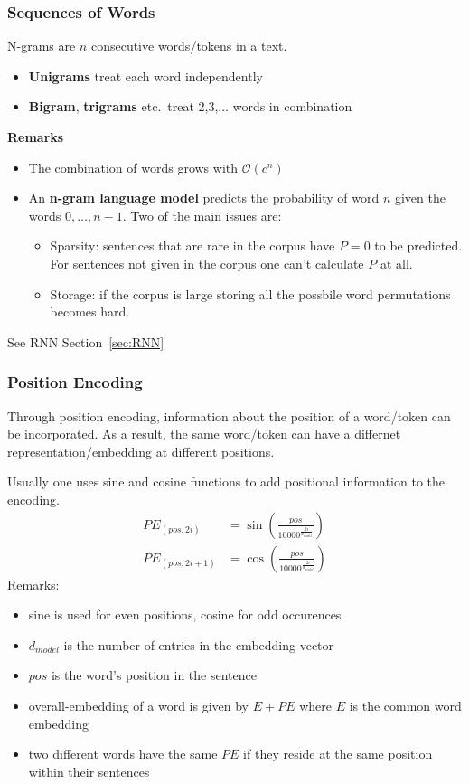 \subsubsection{Sequences of Words}
N-grams are $n$ consecutive words/tokens in a text.
\begin{itemize}
    \item \textbf{Unigrams} treat each word independently
    \item \textbf{Bigram}, \textbf{trigrams} etc.\ treat 2,3,$\ldots$ words in combination
\end{itemize}
\textbf{Remarks}
\begin{itemize}
    \item The combination of words grows with $\mathcal{O}(c^n)$
    \item An \textbf{n-gram language model} predicts the probability of word $n$ given the words $0,\dots,n-1$. Two of the main issues are:
    \begin{itemize}
        \item Sparsity: sentences that are rare in the corpus have $P=0$ to be predicted. For sentences not given in the corpus one can't calculate $P$ at all.
        \item Storage: if the corpus is large storing all the possbile word permutations becomes hard.
    \end{itemize}
\end{itemize}

\newpar{}
See RNN Section~\ref{sec:RNN}

\subsubsection{Position Encoding}
Through position encoding, information about the position of a word/token can be incorporated. As a result, the same word/token can have a differnet representation/embedding at different positions.
\newpar{}

Usually one uses sine and cosine functions to add positional information to the encoding.
\begin{align*}
    PE_{(pos,2i)}&=\sin\left(\frac{pos}{10000^{\frac{2i}{d_{model}}}}\right)\\
    PE_{(pos,2i+1)}&=\cos\left(\frac{pos}{10000^{\frac{2i}{d_{model}}}}\right)
\end{align*}
Remarks:
\begin{itemize}
    \item sine is used for even positions, cosine for odd occurences
    \item $d_{model}$ is the number of entries in the embedding vector
    \item $pos$ is the word's position in the sentence
    \item overall-embedding of a word is given by $E+PE$ where $E$ is the common word embedding
    \item two different words have the same $PE$ if they reside at the same position within their sentences
\end{itemize}

